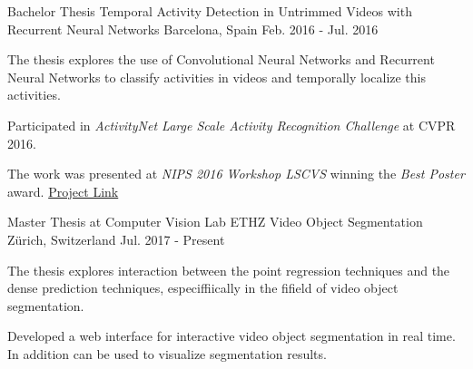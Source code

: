 
\begin{cventries}

\cventry
	{Bachelor Thesis}
  {Temporal Activity Detection in Untrimmed Videos with Recurrent Neural Networks}
	{Barcelona, Spain}
	{Feb. 2016 - Jul. 2016}
  {
    \begin{cvitems}
    \item{
      The thesis explores the use of Convolutional Neural Networks and Recurrent
      Neural Networks to classify activities in videos and temporally localize
      this activities.}
    \item{
      Participated in \emph{ActivityNet Large Scale Activity Recognition
      Challenge} at CVPR 2016.}
		\item{The work was presented at \emph{NIPS 2016 Workshop LSCVS} winning the
		  \emph{Best Poster} award.
      \href{https://imatge-upc.github.io/activitynet-2016-cvprw/}{Project Link}}
    \end{cvitems}
}

\cventry
	{Master Thesis at Computer Vision Lab ETHZ}
	{Video Object Segmentation}
	{Z\"urich, Switzerland}
	{Jul. 2017 - Present}
	{
    \begin{cvitems}
    \item{
      The thesis explores interaction between the point regression techniques
      and the dense prediction techniques, especiffiically in the fifield of
      video object segmentation.}
    \item{
      Developed a web interface for interactive video object segmentation in real time. In addition can be used to visualize segmentation results.
      }
    \end{cvitems}
  }

\end{cventries}


\begin{cvhonors}


\end{cvhonors}
% 
% 
% 
% 
